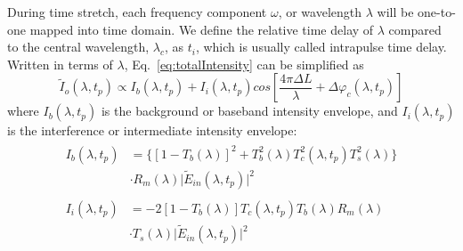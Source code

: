 \documentclass[aps,pra,reprint,superscriptaddress]{revtex4-1}
\begin{document}
During time stretch, each frequency component $\omega$, or wavelength $\lambda$ will be one-to-one mapped into time domain. We define the relative time delay of $\lambda$ compared to the central wavelength, $\lambda_c$, as $t_i$, which is usually called intrapulse time delay. Written in terms of $\lambda$, Eq.~\ref{eq:totalIntensity} can be simplified as
\begin{equation} \label{eq:totalIntensitylambda}
\tilde{I}_o(\lambda, t_p) \propto I_b (\lambda, t_p) + I_i (\lambda, t_p) cos[ \frac{4\pi\Delta L}{\lambda} + \Delta \varphi_c(\lambda, t_p) ]
\end{equation}
where $I_b (\lambda, t_p)$ is the background or baseband intensity envelope, and $I_i (\lambda, t_p)$ is the interference or intermediate intensity envelope:
\begin{align}
\begin{split} \label{eq:backgroundIntensity}
I_b (\lambda, t_p) &= \Big\lbrace [1-T_b(\lambda)]^2 + T_b^2(\lambda) T_c^2(\lambda, t_p) T_s^2(\lambda) \Big\rbrace \\
&\cdot R_m(\lambda) \lvert \tilde{E}_{in}(\lambda, t_p)\rvert^2
\end{split}\\
\begin{split} \label{eq:interferenceIntensity}
I_i (\lambda, t_p) &= - 2 [1-T_b(\lambda)] T_c(\lambda, t_p) T_b(\lambda) R_m(\lambda)\\
& \cdot T_s(\lambda) \lvert \tilde{E}_{in}(\lambda, t_p)\rvert^2
\end{split}
\end{align}
\end{document}
